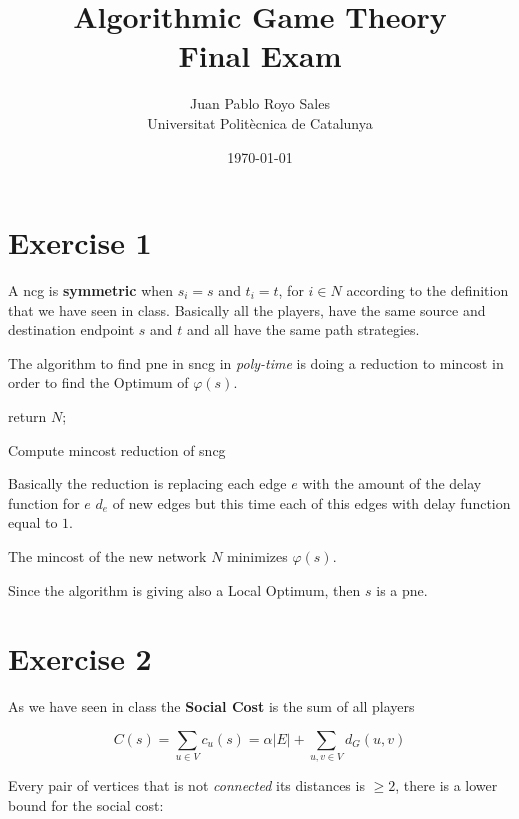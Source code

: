 \documentclass[12pt, a4paper]{article}
\title{%
  Algorithmic Game Theory \\
  Final Exam
}
\author{%
  Juan Pablo Royo Sales\\
  \small{Universitat Politècnica de Catalunya}
}
\date\today
\begin{document}
\maketitle

\section{Exercise 1}
A \acrfull{ncg} is \textbf{symmetric} when $s_i = s$ and $t_i = t$, for $i \in N$ according to the definition that we have seen in class. Basically all the players, have the 
same source and destination endpoint $s$ and $t$ and all have the same path strategies.

The algorithm to find \acrfull{pne} in \acrshort{sncg} in \textit{poly-time} is doing a reduction to \acrfull{mincost}
in order to find the Optimum of $\varphi(s)$.

\begin{algorithm}[H]
  return $N$;
  \caption{Compute \acrshort{mincost} reduction of \acrshort{sncg}}
\end{algorithm}

Basically the reduction is replacing each edge $e$ with the amount of the delay function for $e$ $d_e$ of new edges
but this time each of this edges with delay function equal to $1$.

The \acrshort{mincost} of the new network $N$ minimizes $\varphi(s)$.

Since the algorithm is giving also a Local Optimum, then $s$ is a \acrshort{pne}.

\section{Exercise 2}
As we have seen in class the \textbf{Social Cost} is the sum of all players 

\begin{equation}
  C(s) = \sum_{u \in V} c_u(s) = \alpha|E| + \sum_{u,v \in V} d_G(u,v)
\end{equation}

Every pair of vertices that is not \textit{connected} its distances is $\ge 2$, there is a lower bound for the 
social cost:
\end{document}
